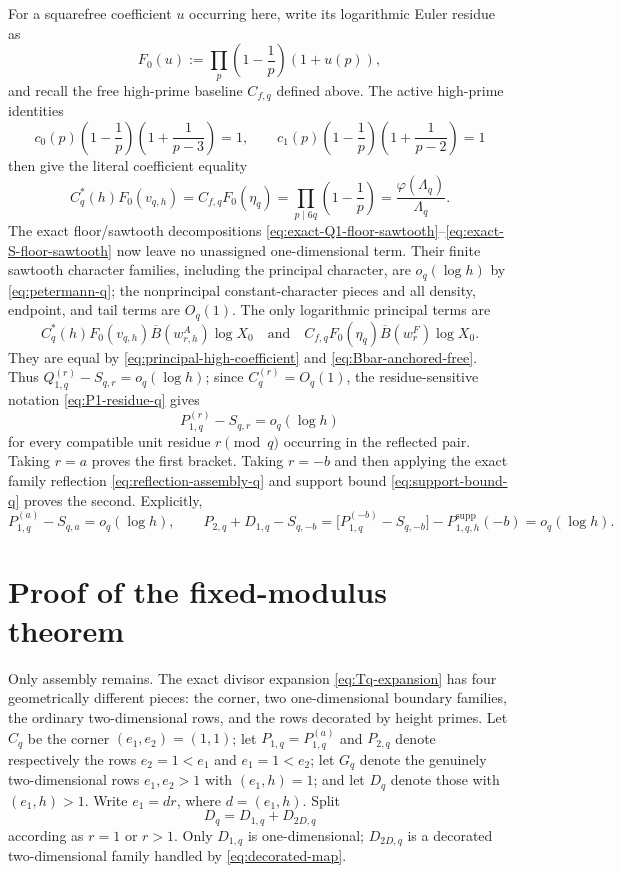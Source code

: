 \documentclass[11pt]{article}
\theoremstyle{definition}
\theoremstyle{remark}
\newcommand{\1}{\mathbf 1}
\newcommand{\ph}{\varphi}
\begin{document}
For a squarefree coefficient $u$ occurring here, write its logarithmic Euler
residue as
\[
F_0(u):=\prod_p\left(1-\frac1p\right)(1+u(p)),
\]
and recall the free high-prime baseline $C_{f,q}$ defined above.
The active high-prime identities
\[
 c_0(p)\left(1-\frac1p\right)\left(1+\frac1{p-3}\right)=1,
 \qquad
 c_1(p)\left(1-\frac1p\right)\left(1+\frac1{p-2}\right)=1
\]
then give the literal coefficient equality
\begin{equation}\label{eq:principal-high-coefficient}
C_q^*(h)F_0(v_{q,h})
=C_{f,q}F_0(\eta_q)
=\prod_{p\mid6q}\left(1-\frac1p\right)
=\frac{\ph(\Lambda_q)}{\Lambda_q}.
\end{equation}
The exact floor/sawtooth decompositions
\eqref{eq:exact-Q1-floor-sawtooth}--\eqref{eq:exact-S-floor-sawtooth} now leave
no unassigned one-dimensional term.  Their finite sawtooth character families, including the principal character,
are $o_q(\log h)$ by \eqref{eq:petermann-q}; the nonprincipal
constant-character pieces and all density, endpoint, and tail terms are
$O_q(1)$.  The only logarithmic principal terms are
\[
C_q^*(h)F_0(v_{q,h})\overline B(w^A_{r,h})\log X_0
\quad\text{and}\quad
C_{f,q}F_0(\eta_q)\overline B(w^F_r)\log X_0.
\]
They are equal by \eqref{eq:principal-high-coefficient} and
\eqref{eq:Bbar-anchored-free}.  Thus
$Q_{1,q}^{(r)}-S_{q,r}=o_q(\log h)$; since
$C_q^{(r)}=O_q(1)$, the residue-sensitive notation
\eqref{eq:P1-residue-q} gives
\begin{equation}\label{eq:pure-one-uniform-q}
P_{1,q}^{(r)}-S_{q,r}=o_q(\log h)
\end{equation}
for every compatible unit residue $r\pmod q$ occurring in the reflected pair.
Taking $r=a$ proves the first bracket.  Taking $r=-b$ and then applying the
exact family reflection \eqref{eq:reflection-assembly-q} and support bound
\eqref{eq:support-bound-q} proves the second.  Explicitly,
\begin{equation}\label{eq:one-dimensional-q}
P_{1,q}^{(a)}-S_{q,a}=o_q(\log h),
\qquad
P_{2,q}+D_{1,q}-S_{q,-b}
=\bigl[P_{1,q}^{(-b)}-S_{q,-b}\bigr]
-P_{1,q,h}^{\mathrm{supp}}(-b)
=o_q(\log h).
\end{equation}

\section{Proof of the fixed-modulus theorem}\label{sec:proof-main}

Only assembly remains.  The exact divisor expansion \eqref{eq:Tq-expansion} has four geometrically different pieces: the corner, two one-dimensional boundary families, the ordinary two-dimensional rows, and the rows decorated by height primes.  Let $C_q$ be the corner $(e_1,e_2)=(1,1)$; let $P_{1,q}=P_{1,q}^{(a)}$ and $P_{2,q}$ denote respectively the rows $e_2=1<e_1$ and $e_1=1<e_2$; let $G_q$ denote the genuinely two-dimensional rows $e_1,e_2>1$ with $(e_1,h)=1$; and let $D_q$ denote those with $(e_1,h)>1$.  Write $e_1=dr$, where $d=(e_1,h)$.  Split
\[
D_q=D_{1,q}+D_{2D,q}
\]
according as $r=1$ or $r>1$.  Only $D_{1,q}$ is one-dimensional; $D_{2D,q}$ is a decorated two-dimensional family handled by \eqref{eq:decorated-map}.
\end{document}
